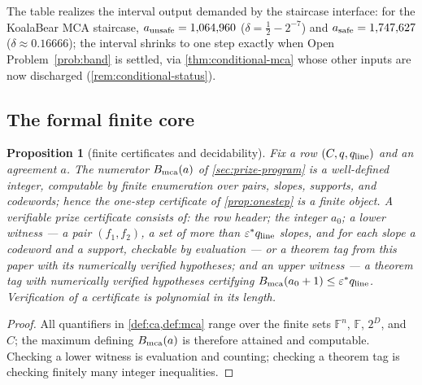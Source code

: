 \documentclass[11pt]{article}
\newtheorem{proposition}[theorem]{Proposition}
\theoremstyle{definition}
\theoremstyle{remark}
\newcommand{\F}{\mathbb{F}}
\begin{document}
The table realizes the interval output demanded by the staircase interface: for the KoalaBear MCA staircase, $a_{\rm unsafe}=1{,}064{,}960$ \textup($\delta=\frac12-2^{-7}$\textup) and $a_{\rm safe}=1{,}747{,}627$ \textup($\delta\approx0.16666$\textup); the interval shrinks to one step exactly when Open Problem~\ref{prob:band} is settled, via \cref{thm:conditional-mca} whose other inputs are now discharged \textup(\cref{rem:conditional-status}\textup).

\subsection{The formal finite core}\label{sec:discharge-T7}

\begin{proposition}[finite certificates and decidability]\label{prop:finite-certificate}
Fix a row $(C,q,q_{\rm line})$ and an agreement $a$. The numerator $B_{\rm mca}(a)$ of \cref{sec:prize-program} is a well-defined integer, computable by finite enumeration over pairs, slopes, supports, and codewords; hence the one-step certificate of \cref{prop:onestep} is a finite object. A verifiable prize certificate consists of: the row header; the integer $a_0$; a \emph{lower witness} --- a pair $(f_1,f_2)$, a set of more than $\varepsilon^*q_{\rm line}$ slopes, and for each slope a codeword and a support, checkable by evaluation --- or a theorem tag from this paper with its numerically verified hypotheses; and an \emph{upper witness} --- a theorem tag with numerically verified hypotheses certifying $B_{\rm mca}(a_0+1)\le\varepsilon^*q_{\rm line}$. Verification of a certificate is polynomial in its length.
\end{proposition}

\begin{proof}
All quantifiers in \cref{def:ca,def:mca} range over the finite sets $\F^n$, $\F$, $2^D$, and $C$; the maximum defining $B_{\rm mca}(a)$ is therefore attained and computable. Checking a lower witness is evaluation and counting; checking a theorem tag is checking finitely many integer inequalities.
\end{proof}
\end{document}
